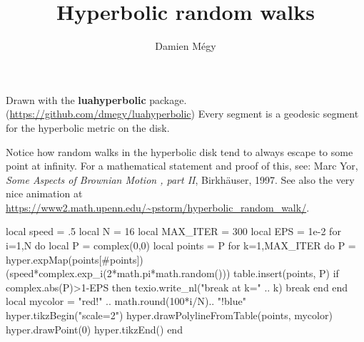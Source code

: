 \documentclass[a4paper]{article}
\begin{document}
\title{Hyperbolic random walks}
\author{Damien Mégy}
\date{}
\maketitle
\pagestyle{empty}
\thispagestyle{empty}
Drawn with the \textbf{\textsf{luahyperbolic}} package. (\url{https://github.com/dmegy/luahyperbolic}) Every segment is a geodesic segment for the hyperbolic metric on the disk.

Notice how random walks in the hyperbolic disk tend to always escape to some point at infinity.
For a mathematical statement and proof of this, see:  Marc Yor, \emph{Some Aspects of Brownian Motion , part II}, Birkhäuser, 1997.
See also the  very nice animation at \url{https://www2.math.upenn.edu/~pstorm/hyperbolic_random_walk/}.
\begin{center}
\noindent
\begin{luacode*}
local speed = .5
local N = 16
local MAX_ITER = 300
local EPS = 1e-2
for i=1,N do
	local P = complex(0,0)
	local points = {P}
	for k=1,MAX_ITER do
		P =  hyper.expMap(points[#points])(speed*complex.exp_i(2*math.pi*math.random()))
		table.insert(points, P)
		if complex.abs(P)>1-EPS then
			texio.write_nl("break at k=" .. k)
			break
		end
	end
	local mycolor = "red!" .. math.round(100*i/N).. "!blue"
	hyper.tikzBegin("scale=2")
	hyper.drawPolylineFromTable(points, mycolor)
	hyper.drawPoint(0)
	hyper.tikzEnd()
end
\end{luacode*}
\end{center}
\end{document}
